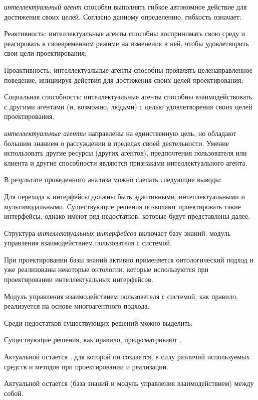 \textit{интеллектуальный агент} способен выполнять гибкое автономное действие для достижения своих целей. Согласно данному определению, гибкость означает:
\begin{textitemize}
	\item Реактивность: интеллектуальные агенты способны воспринимать свою среду и реагировать в своевременном режиме на изменения в ней, чтобы удовлетворить свои цели проектирования;
	\item Проактивность: интеллектуальные агенты способны проявлять целенаправленное поведение, инициируя действия для достижения своих целей проектирования;
	\item Социальная способность: интеллектуальные агенты способны взаимодействовать с другими агентами (и, возможно, людьми) с целью удовлетворения своих целей проектирования.
\end{textitemize}
\textit{интеллектуальные агенты} направлены на единственную цель, но обладают большим знанием о рассуждении в пределах своей деятельности. Умение использовать другие ресурсы (других агентов), предпочтения пользователя или клиента и другие способности являются признаками интеллектуального агента.

В результате проведенного анализа можно сделать следующие выводы:
\begin{textitemize}
	\item Для перехода к  интерфейсы должны быть адаптивными, интеллектуальными и мультимодальными. Существующие решения позволяют проектировать такие интерфейсы, однако имеют ряд недостатков, которые будут представлены далее.
	\item Структура \textit{интеллектуальных интерфейсов} включает базу знаний, модуль управления взаимодействием пользователя с системой.
	\item При проектировании базы знаний активно применяется онтологический подход и уже реализованы некоторые онтологии, которые используются при проектировании интеллектуальных интерфейсов.
	\item Модуль управления взаимодействием пользователя с системой, как правило, реализуется на основе многоагентного подхода.
\end{textitemize} 

Среди недостатков существующих решений можно выделить:
\begin{textitemize}
	\item Существующие решения, как правило, предусматривают .
	\item Актуальной остается , для которой он создается, в силу различий используемых средств и методов при проектировании и реализации.
	\item Актуальной остается  (база знаний и модуль управления взаимодействием) между собой.
\end{textitemize}

